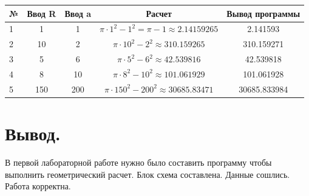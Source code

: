\begin{tabular}{|l|cc|c|c|}
    \hline
    № & Ввод R & Ввод a & Расчет & Вывод программы \\
    \hline
    1 & 1   & 1   &$ \pi \cdot 1^2 - 1^2 = \pi - 1 \approx 2.14159265 $& 2.141593     \\
    2 & 10  & 2   &$ \pi \cdot 10^2 - 2^2 \approx 310.159265          $& 310.159271  \\
    3 & 5   & 6   &$ \pi \cdot 5^2 - 6^2 \approx 42.539816            $& 42.539818   \\
    4 & 8   & 10  &$ \pi \cdot 8^2 - 10^2 \approx 101.061929          $& 101.061928  \\
    5 & 150 & 200 &$ \pi \cdot 150^2 - 200^2 \approx 30685.83471      $& 30685.833984\\
    \hline
\end{tabular}

\section{Вывод.}

В первой лабораторной работе нужно было составить программу чтобы выполнить геометрический расчет. 
Блок схема составлена. Данные сошлись. Работа корректна.



